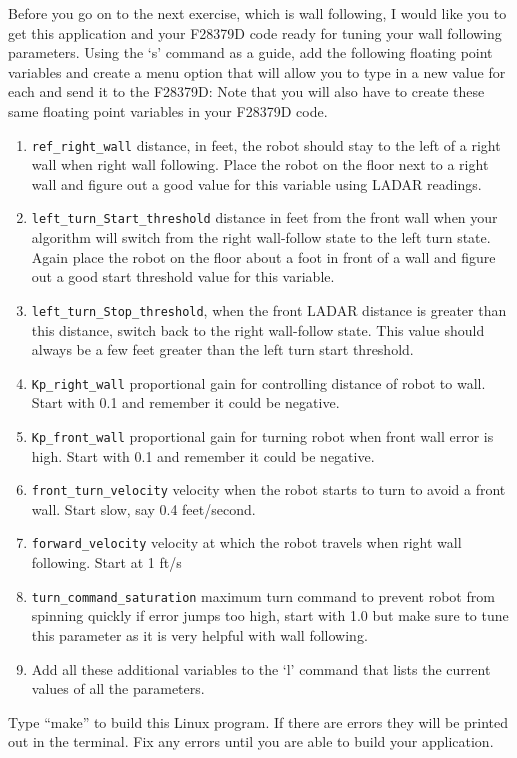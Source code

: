 \documentclass[11pt]{article}
\begin{document}
    Before you go on to the next exercise, which is wall following, I would like you to get this application and your F28379D code ready for tuning your wall following parameters. Using the ‘s’ command as a guide, add the following floating point variables and create a menu option that will allow you to type in a new value for each and send it to the F28379D: Note that you will also have to create these same floating point variables in your F28379D code.
    {%
        \begin{enumerate}
                \item \texttt{ref_right_wall} distance, in feet, the robot should stay to the left of a right wall when right wall following. Place the robot on the floor next to a right wall and figure out a good value for this variable using LADAR readings.
                \item \texttt{left_turn_Start_threshold} distance in feet from the front wall when your algorithm will switch from the right wall-follow state to the left turn state. Again place the robot on the floor about a foot in front of a wall and figure out a good start threshold value for this variable.
                \item \texttt{left_turn_Stop_threshold}, when the front LADAR distance is greater than this distance, switch back to the right wall-follow state. This value should always be a few feet greater than the left turn start threshold.
                \item \texttt{Kp_right_wall} proportional gain for controlling distance of robot to wall. Start with 0.1 and remember it could be negative.
                \item \texttt{Kp_front_wall} proportional gain for turning robot when front wall error is high. Start with 0.1 and remember it could be negative.
                \item \texttt{front_turn_velocity} velocity when the robot starts to turn to avoid a front wall. Start slow, say 0.4 feet/second.
                \item \texttt{forward_velocity} velocity at which the robot travels when right wall following. Start at 1 ft/s
                \item[g.] \texttt{turn_command_saturation} maximum turn command to prevent robot from spinning quickly if error jumps too high, start with 1.0 but make sure to tune this parameter as it is very helpful with wall following.
            \item Add all these additional variables to the ‘l’ command that lists the current values of all the parameters.
    \end{enumerate}}
    Type “make” to build this Linux program. If there are errors they will be printed out in the terminal. Fix any errors until you are able to build your application.
\end{document}
